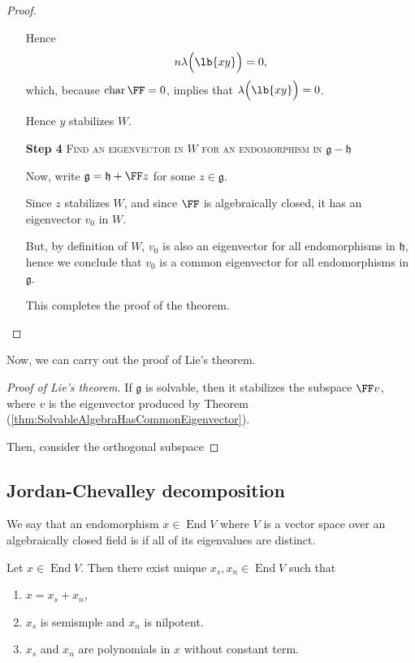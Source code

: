 \documentclass{article}
\DeclarePairedDelimiter\lb\lbrack\rbrack
\DeclareMathOperator{\End}{End}
\DeclareMathOperator{\opchar}{char}
\newcommand*\frkg{{\ensuremath{\mathfrak{g}}}}
\newcommand*\frkh{{\ensuremath{\mathfrak{h}}}}
\begin{document}
\begin{proof}
\begin{itemize}
            Hence
            \[
                n\lambda\Big(\lb{xy}\Big)
                =
                0,
            \]
            which, because $\opchar \FF = 0$, implies that $\lambda\Big(\lb{xy}\Big) = 0$.

            Hence $y$ stabilizes $W$.
    \item[\textbf{Step 4}]
        \textsc{\color{Crimson} Find an eigenvector in $W$ for an endomorphism in $\frkg - \frkh$}

        Now, write $\frkg = \frkh + \FF z$ for some $z \in \frkg$.

        Since $z$ stabilizes $W$, and since $\FF$ is algebraically closed, it has an eigenvector $v_0$ in $W$.

        But, by definition of $W$, $v_0$ is also an eigenvector for all endomorphisms in $\frkh$, hence we conclude that $v_0$ is a common eigenvector for all endomorphisms in $\frkg$.

        This completes the proof of the theorem.
    \end{itemize}
\end{proof}

Now, we can carry out the proof of Lie's theorem.

\begin{proof}[Proof of Lie's theorem]
    If $\frkg$ is solvable, then it stabilizes the subspace $\FF v$, where $v$ is the eigenvector produced by Theorem (\ref{thm:SolvableAlgebraHasCommonEigenvector}).

    Then, consider the orthogonal subspace
\end{proof}

\subsection{Jordan-Chevalley decomposition}

We say that an endomorphism $x \in \End V$ where $V$ is a vector space over an algebraically closed field is  if all of its eigenvalues are distinct.

\begin{theorem}
    \label{thm:JordanChevalley}
    Let $x \in \End V$.
    Then there exist unique $x_s, x_n \in \End V$ such that
    \begin{enumerate}[label=(\alph*)]
        \item 
            $x = x_s + x_n$,
        \item 
            $x_s$ is semismple and $x_n$ is nilpotent.
        \item 
            $x_s$ and $x_n$ are polynomials in $x$ without constant term.
    \end{enumerate}
\end{theorem}
\end{document}
